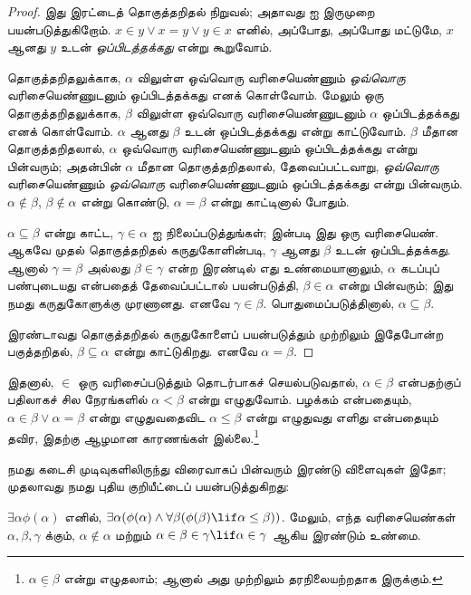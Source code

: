 \documentclass[../../../include/open-logic-section]{subfiles}
\begin{document}
\begin{proof}
இது இரட்டைத் தொகுத்தறிதல் நிறுவல்; அதாவது
 ஐ இருமுறை பயன்படுத்துகிறோம். $x \in y \lor
x = y \lor y \in x$ எனில், அப்போது, அப்போது மட்டுமே, $x$ ஆனது $y$
உடன் \emph{ஒப்பிடத்தக்கது} என்று கூறுவோம்.

தொகுத்தறிதலுக்காக, $\alpha$ விலுள்ள ஒவ்வொரு வரிசையெண்ணும்
\emph{ஒவ்வொரு} வரிசையெண்ணுடனும் ஒப்பிடத்தக்கது எனக் கொள்வோம். மேலும் ஒரு
தொகுத்தறிதலுக்காக, $\beta$ விலுள்ள ஒவ்வொரு வரிசையெண்ணுடனும் $\alpha$
ஒப்பிடத்தக்கது எனக் கொள்வோம். $\alpha$ ஆனது $\beta$ உடன் ஒப்பிடத்தக்கது
என்று காட்டுவோம். $\beta$ மீதான தொகுத்தறிதலால், $\alpha$ ஒவ்வொரு
வரிசையெண்ணுடனும் ஒப்பிடத்தக்கது என்று பின்வரும்; அதன்பின் $\alpha$ மீதான
தொகுத்தறிதலால், தேவைப்பட்டவாறு, \emph{ஒவ்வொரு} வரிசையெண்ணும்
\emph{ஒவ்வொரு} வரிசையெண்ணுடனும் ஒப்பிடத்தக்கது என்று பின்வரும்.
$\alpha \notin \beta$, $\beta \notin \alpha$ என்று கொண்டு,
$\alpha = \beta$ என்று காட்டினால் போதும்.

$\alpha \subseteq \beta$ என்று காட்ட, $\gamma \in \alpha$ ஐ
நிலைப்படுத்துங்கள்;  இன்படி இது ஒரு வரிசையெண்.
ஆகவே முதல் தொகுத்தறிதல் கருதுகோளின்படி, $\gamma$ ஆனது $\beta$ உடன்
ஒப்பிடத்தக்கது. ஆனால் $\gamma = \beta$ அல்லது $\beta \in \gamma$
என்ற இரண்டில் எது உண்மையானாலும், $\alpha$ கடப்புப் பண்புடையது என்பதைத்
தேவைப்பட்டால் பயன்படுத்தி, $\beta \in \alpha$ என்று பின்வரும்; இது நமது
கருதுகோளுக்கு முரணானது. எனவே $\gamma \in \beta$. பொதுமைப்படுத்தினால்,
$\alpha \subseteq \beta$.

இரண்டாவது தொகுத்தறிதல் கருதுகோளைப் பயன்படுத்தும் முற்றிலும் இதேபோன்ற
பகுத்தறிதல், $\beta \subseteq \alpha$ என்று காட்டுகிறது. எனவே
$\alpha = \beta$.
\end{proof}\noindent
இதனால், $\in$ ஒரு வரிசைப்படுத்தும் தொடர்பாகச் செயல்படுவதால்,
$\alpha \in \beta$ என்பதற்குப் பதிலாகச் சில நேரங்களில் $\alpha <\beta$
என்று எழுதுவோம். பழக்கம் என்பதையும், $\alpha \in \beta \lor \alpha =
\beta$ என்று எழுதுவதைவிட $\alpha \leq \beta$ என்று எழுதுவது எளிது
என்பதையும் தவிர, இதற்கு ஆழமான காரணங்கள் இல்லை.\footnote{$\alpha
\mathrel{\underline{\in}} \beta$ என்று எழுதலாம்; ஆனால் அது முற்றிலும்
தரநிலையற்றதாக இருக்கும்.}

நமது கடைசி முடிவுகளிலிருந்து விரைவாகப் பின்வரும் இரண்டு விளைவுகள் இதோ;
முதலாவது நமது புதிய குறியீட்டைப் பயன்படுத்துகிறது:

\begin{cor}
$\exists \alpha\phi(\alpha)$ எனில், $\exists \alpha(\phi(\alpha)
\land \forall \beta(\phi(\beta) \lif \alpha \leq \beta))$.
மேலும், எந்த வரிசையெண்கள் $\alpha, \beta, \gamma$ க்கும்,
$\alpha \notin \alpha$ மற்றும் $\alpha \in \beta \in \gamma \lif
\alpha \in \gamma$ ஆகிய இரண்டும் உண்மை.
\end{cor}
\end{document}
